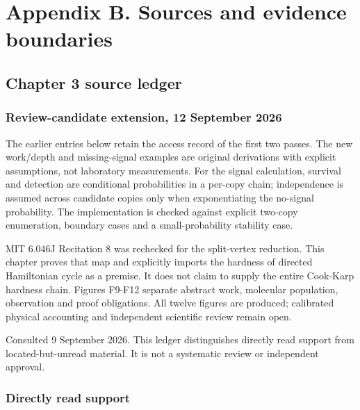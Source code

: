 \section{Appendix B. Sources and evidence
boundaries}\label{appendix-b.-sources-and-evidence-boundaries}

\subsection{Chapter 3 source ledger}\label{chapter-3-source-ledger}

\subsubsection{Review-candidate extension, 12 September
2026}\label{review-candidate-extension-12-september-2026}

The earlier entries below retain the access record of the first two
passes. The new work/depth and missing-signal examples are original
derivations with explicit assumptions, not laboratory measurements. For
the signal calculation, survival and detection are conditional
probabilities in a per-copy chain; independence is assumed across
candidate copies only when exponentiating the no-signal probability. The
implementation is checked against explicit two-copy enumeration,
boundary cases and a small-probability stability case.

MIT 6.046J Recitation 8 was rechecked for the split-vertex reduction.
This chapter proves that map and explicitly imports the hardness of
directed Hamiltonian cycle as a premise. It does not claim to supply the
entire Cook-Karp hardness chain. Figures F9-F12 separate abstract work,
molecular population, observation and proof obligations. All twelve
figures are produced; calibrated physical accounting and independent
scientific review remain open.

Consulted 9 September 2026. This ledger distinguishes directly read
support from located-but-unread material. It is not a systematic review
or independent approval.

\subsubsection{Directly read support}\label{directly-read-support}

